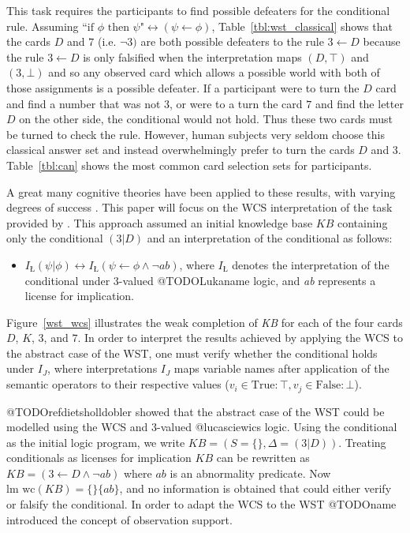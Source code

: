 This task requires the participants to find possible defeaters for the conditional rule. Assuming $\textrm{``if } \phi \textrm{ then }\psi \textrm{"} \leftrightarrow (\psi \leftarrow \phi)$, Table~\ref{tbl:wst_classical} shows that the cards $D$ and $7$ (i.e. $\lnot 3)$ are both possible defeaters to the rule $3\leftarrow D$ because the rule $3 \leftarrow D$ is only falsified when the interpretation maps $(D,\top)$ and $(3, \bot)$ and so any observed card which allows a possible world with both of those assignments is a possible defeater. If a participant were to turn the $D$ card and find a number that was not $3$, or were to a turn the card $7$ and find the letter $D$ on the other side, the conditional would not hold. Thus these two cards must be turned to check the rule. However, human subjects very seldom choose this classical answer set and instead overwhelmingly prefer to turn the cards $D$ and $3$. Table~\ref{tbl:can} shows the most common card selection sets for participants.

A great many cognitive theories have been applied to these results, with varying degrees of success \cite{ragni2017formal}. This paper will focus on the WCS interpretation of the task provided by \citep{ragni2017wason}. This approach assumed an initial knowledge base $\textit{KB}$ containing only the conditional $(3|D)$ and an interpretation of the conditional as follows:

\begin{itemize}
\item $I_\textrm{\L}(\psi|\phi)\leftrightarrow I_\textrm{\L}(\psi \leftarrow \phi \land \lnot \textit{ab})$, where $I_\textrm{\L}$ denotes the interpretation of the conditional under 3-valued @TODOLukaname logic, and \textit{ab} represents a license for implication.
\end{itemize}

Figure~\ref{wst_wcs} illustrates the weak completion of \textit{KB} for each of the four cards $D$, $K$, $3$, and $7$. In order to interpret the results achieved by applying the WCS to the abstract case of the WST, one must verify whether the conditional holds under $I_J$, where interpretations $I_J$ maps variable names after application of the semantic operators to their respective values ($v_i \in \textrm{True}:\top, v_j\in \textrm{False}:\bot$).

@TODOrefdietsholldobler showed that the abstract case of the WST could be modelled using the WCS and 3-valued @lucasciewics logic. Using the conditional as the initial logic program, we write $KB=(S=\{\},\Delta=(3|D))$. Treating conditionals as licenses for implication $KB$ can be rewritten as $KB=(3\leftarrow D \land \lnot ab)$ where $ab$ is an abnormality predicate. Now $\textrm{lm wc}(KB)=\{\}\{ab\}$, and no information is obtained that could either verify or falsify the conditional. In order to adapt the WCS to the WST @TODOname introduced the concept of observation support.

